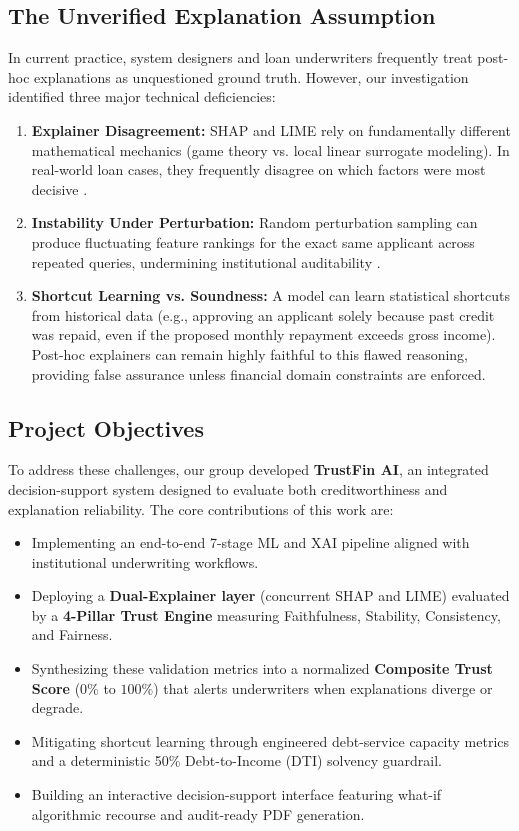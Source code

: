 \documentclass[conference]{IEEEtran}
\begin{document}
\subsection{The Unverified Explanation Assumption}
In current practice, system designers and loan underwriters frequently treat post-hoc explanations as unquestioned ground truth. However, our investigation identified three major technical deficiencies:
\begin{enumerate}
    \item \textbf{Explainer Disagreement:} SHAP and LIME rely on fundamentally different mathematical mechanics (game theory vs. local linear surrogate modeling). In real-world loan cases, they frequently disagree on which factors were most decisive \cite{krishna2022}.
    \item \textbf{Instability Under Perturbation:} Random perturbation sampling can produce fluctuating feature rankings for the exact same applicant across repeated queries, undermining institutional auditability \cite{alvarez2018}.
    \item \textbf{Shortcut Learning vs. Soundness:} A model can learn statistical shortcuts from historical data (e.g., approving an applicant solely because past credit was repaid, even if the proposed monthly repayment exceeds gross income). Post-hoc explainers can remain highly faithful to this flawed reasoning, providing false assurance unless financial domain constraints are enforced.
\end{enumerate}

\subsection{Project Objectives}
To address these challenges, our group developed \textbf{TrustFin AI}, an integrated decision-support system designed to evaluate both creditworthiness and explanation reliability. The core contributions of this work are:
\begin{itemize}
    \item Implementing an end-to-end 7-stage ML and XAI pipeline aligned with institutional underwriting workflows.
    \item Deploying a \textbf{Dual-Explainer layer} (concurrent SHAP and LIME) evaluated by a \textbf{4-Pillar Trust Engine} measuring Faithfulness, Stability, Consistency, and Fairness.
    \item Synthesizing these validation metrics into a normalized \textbf{Composite Trust Score} ($0\%$ to $100\%$) that alerts underwriters when explanations diverge or degrade.
    \item Mitigating shortcut learning through engineered debt-service capacity metrics and a deterministic 50\% Debt-to-Income (DTI) solvency guardrail.
    \item Building an interactive decision-support interface featuring what-if algorithmic recourse and audit-ready PDF generation.
\end{itemize}
\end{document}
